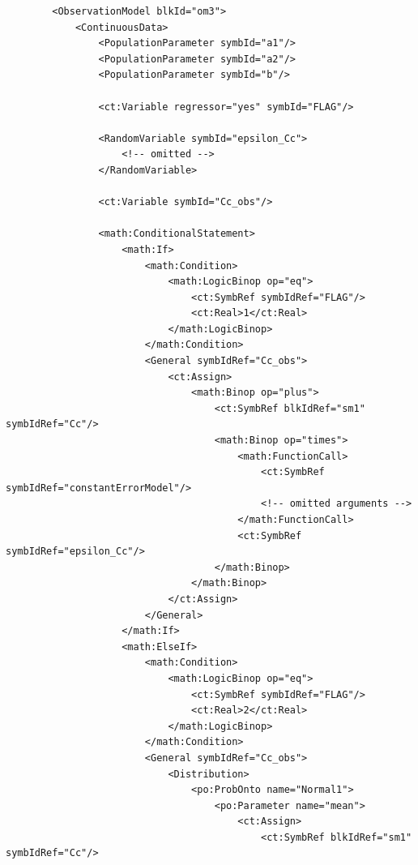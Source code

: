 \lstset{language=XML}
\begin{lstlisting}
        <ObservationModel blkId="om3">
            <ContinuousData>
                <PopulationParameter symbId="a1"/>
                <PopulationParameter symbId="a2"/>
                <PopulationParameter symbId="b"/>
                
                <ct:Variable regressor="yes" symbId="FLAG"/>

                <RandomVariable symbId="epsilon_Cc">
                    <!-- omitted -->
                </RandomVariable>
                
                <ct:Variable symbId="Cc_obs"/>
                
                <math:ConditionalStatement>
                    <math:If>
                        <math:Condition>
                            <math:LogicBinop op="eq">
                                <ct:SymbRef symbIdRef="FLAG"/>
                                <ct:Real>1</ct:Real>
                            </math:LogicBinop>
                        </math:Condition>
                        <General symbIdRef="Cc_obs">
                            <ct:Assign>
                                <math:Binop op="plus">
                                    <ct:SymbRef blkIdRef="sm1" symbIdRef="Cc"/>
                                    <math:Binop op="times">
                                        <math:FunctionCall>
                                            <ct:SymbRef symbIdRef="constantErrorModel"/>
                                            <!-- omitted arguments -->
                                        </math:FunctionCall>
                                        <ct:SymbRef symbIdRef="epsilon_Cc"/>
                                    </math:Binop>
                                </math:Binop>
                            </ct:Assign>
                        </General>
                    </math:If>
                    <math:ElseIf>
                        <math:Condition>
                            <math:LogicBinop op="eq">
                                <ct:SymbRef symbIdRef="FLAG"/>
                                <ct:Real>2</ct:Real>
                            </math:LogicBinop>
                        </math:Condition>
                        <General symbIdRef="Cc_obs">
                            <Distribution>
                                <po:ProbOnto name="Normal1">
                                    <po:Parameter name="mean">
                                        <ct:Assign>
                                            <ct:SymbRef blkIdRef="sm1" symbIdRef="Cc"/>

\end{lstlisting}
